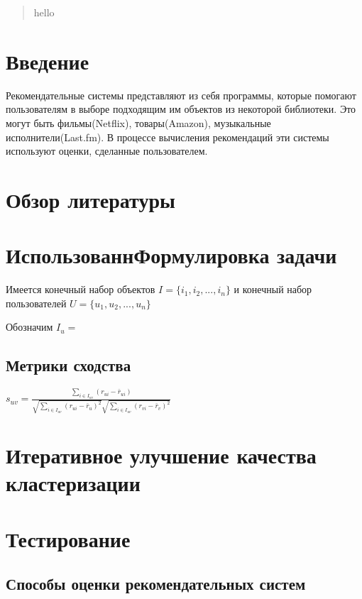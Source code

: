 \documentclass[12pt]{article} %
\begin{document}
\begin{abstract}
hello
\end{abstract}

\section{Введение}
\par Рекомендательные системы представляют из себя программы, которые помогают пользователям в выборе подходящим им объектов из некоторой библиотеки.  %
Это могут быть фильмы(Netflix), товары(Amazon), музыкальные исполнители(Last.fm). В процессе вычисления рекомендаций эти системы используют оценки, сделанные пользователем. 


\section{Обзор литературы}
\section{ИспользованнФормулировка задачи}
\par
Имеется конечный набор объектов $I=\{i_{1}, i_{2}, ..., i_{n}\}$ и конечный набор пользователей $U=\{u_{1}, u_{2}, ..., u_{n}\}$

\par
Обозначим $I_{u}= $

\subsection{Метрики сходства}

$s_{uv} = \frac{\sum_{i \in I_{uv}} (r_{ui} - \bar{r}_{ui})}{\sqrt{\sum_{i \in I_{uv}}  (r_{ui} - \bar{r}_{u})^2} \sqrt{\sum_{i \in I_{uv}}  (r_{vi} - \bar{r}_{v})^2}}$

\section{Итеративное улучшение качества кластеризации}

\section{Тестирование}
\subsection{Способы оценки рекомендательных систем}
\end{document}
